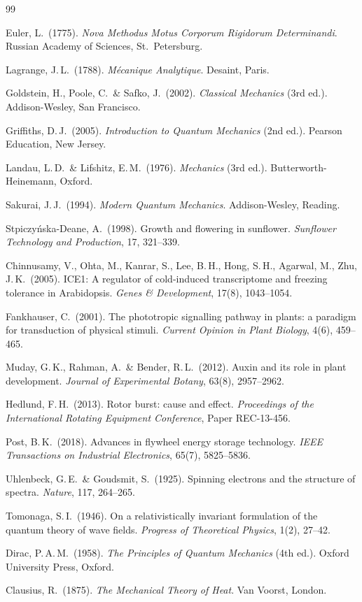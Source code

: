 \documentclass[12pt,a4paper]{report}
\theoremstyle{plain}
\theoremstyle{definition}
\theoremstyle{remark}
\begin{document}
\begin{thebibliography}{99}
	
	Euler, L.\ (1775).
	\textit{Nova Methodus Motus Corporum Rigidorum Determinandi}.
	Russian Academy of Sciences, St.\ Petersburg.
	
	Lagrange, J.\,L.\ (1788).
	\textit{Mécanique Analytique}.
	Desaint, Paris.
	
	Goldstein, H., Poole, C.\ \& Safko, J.\ (2002).
	\textit{Classical Mechanics} (3rd ed.).
	Addison-Wesley, San Francisco.
	
	Griffiths, D.\,J.\ (2005).
	\textit{Introduction to Quantum Mechanics} (2nd ed.).
	Pearson Education, New Jersey.
	
	Landau, L.\,D.\ \& Lifshitz, E.\,M.\ (1976).
	\textit{Mechanics} (3rd ed.).
	Butterworth-Heinemann, Oxford.
	
	Sakurai, J.\,J.\ (1994).
	\textit{Modern Quantum Mechanics}.
	Addison-Wesley, Reading.
	
	Stpiczyńska-Deane, A.\ (1998).
	Growth and flowering in sunflower.
	\textit{Sunflower Technology and Production}, 17, 321--339.
	
	Chinnusamy, V., Ohta, M., Kanrar, S., Lee, B.\,H., Hong, S.\,H.,
	Agarwal, M., Zhu, J.\,K.\ (2005).
	ICE1: A regulator of cold-induced transcriptome and freezing tolerance in Arabidopsis.
	\textit{Genes \& Development}, 17(8), 1043--1054.
	
	Fankhauser, C.\ (2001).
	The phototropic signalling pathway in plants: a paradigm for transduction of physical stimuli.
	\textit{Current Opinion in Plant Biology}, 4(6), 459--465.
	
	Muday, G.\,K., Rahman, A.\ \& Bender, R.\,L.\ (2012).
	Auxin and its role in plant development.
	\textit{Journal of Experimental Botany}, 63(8), 2957--2962.
	
	Hedlund, F.\,H.\ (2013).
	Rotor burst: cause and effect.
	\textit{Proceedings of the International Rotating Equipment Conference}, Paper REC-13-456.
	
	Post, B.\,K.\ (2018).
	Advances in flywheel energy storage technology.
	\textit{IEEE Transactions on Industrial Electronics}, 65(7), 5825--5836.
	
	Uhlenbeck, G.\,E.\ \& Goudsmit, S.\ (1925).
	Spinning electrons and the structure of spectra.
	\textit{Nature}, 117, 264--265.
	
	Tomonaga, S.\,I.\ (1946).
	On a relativistically invariant formulation of the quantum theory of wave fields.
	\textit{Progress of Theoretical Physics}, 1(2), 27--42.
	
	Dirac, P.\,A.\,M.\ (1958).
	\textit{The Principles of Quantum Mechanics} (4th ed.).
	Oxford University Press, Oxford.
	
	Clausius, R.\ (1875).
	\textit{The Mechanical Theory of Heat}.
	Van Voorst, London.
	
\end{thebibliography}
	
\end{document}
